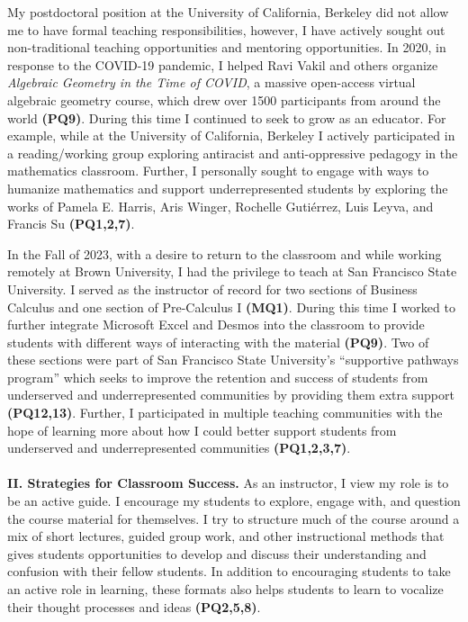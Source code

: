 \documentclass[11pt]{article}
\begin{document}
My postdoctoral position at the University of California, Berkeley did not allow me to have formal teaching responsibilities, however, I have actively sought out non-traditional teaching opportunities and mentoring opportunities. In 2020, in response to the COVID-19 pandemic, I helped Ravi Vakil and others organize \textit{Algebraic Geometry in the Time of COVID}, a massive open-access virtual algebraic geometry course, which drew over 1500 participants from around the world  \textbf{(PQ9)}. During this time I continued to seek to grow as an educator. For example, while at the University of California, Berkeley I actively participated in a reading/working group exploring antiracist and anti-oppressive pedagogy in the mathematics classroom. Further, I personally sought to engage with ways to humanize mathematics and support underrepresented students by exploring the works of Pamela E. Harris, Aris Winger, Rochelle Guti\'{e}rrez, Luis Leyva, and Francis Su \textbf{(PQ1,2,7)}. %

In the Fall of 2023, with a desire to return to the classroom and while working remotely at Brown University, I had the privilege to teach at San Francisco State University. I served as the instructor of record for two sections of Business Calculus and one section of Pre-Calculus I \textbf{(MQ1)}. During this time I worked to further integrate Microsoft Excel and Desmos into the classroom to provide students with different ways of interacting with the material \textbf{(PQ9)}. Two of these sections were part of San Francisco State University's  ``supportive pathways program'' which seeks to improve the retention and success of students from underserved and underrepresented communities by providing them extra support \textbf{(PQ12,13)}. Further,  I participated in multiple teaching communities with the hope of learning more about how I could better support students from underserved and underrepresented communities \textbf{(PQ1,2,3,7)}. %
\\
\\
\noindent \textbf{II. Strategies for Classroom Success.} As an instructor, I view my role is to be an active guide. I encourage my students to explore, engage with, and question the course material for themselves. I try to structure much of the course around a mix of short lectures, guided group work, and other instructional methods that gives students opportunities to develop and discuss their understanding and confusion with their fellow students. In addition to encouraging students to take an active role in learning, these formats also helps students to learn to vocalize their thought processes and ideas \textbf{(PQ2,5,8)}.
\end{document}
